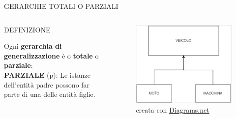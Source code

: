 \documentclass[aspectratio=1610]{beamer}
\begin{document}
\begin{frame}{GERARCHIE TOTALI O PARZIALI}
    \begin{columns}
            \begin{alertblock}{DEFINIZIONE}
                \begin{minipage}{0.96\linewidth}
                    \justifying
                    Ogni \textbf{gerarchia di generalizzazione} è o \textbf{totale} o \textbf{parziale}:\\
                    \bigskip
                    \textbf{PARZIALE} (p): Le istanze dell'entità padre possono far parte di una delle entità figlie.\\
                    \bigskip
                \end{minipage}
            \end{alertblock}
            \begin{figure}
        \includegraphics[width=.8\linewidth]{img/parziale.png}
        \caption{{creata con \href{https://app.diagrams.net/}{Diagrams.net}}}
            \end{figure}
    \end{columns}
\end{frame}
\end{document}
